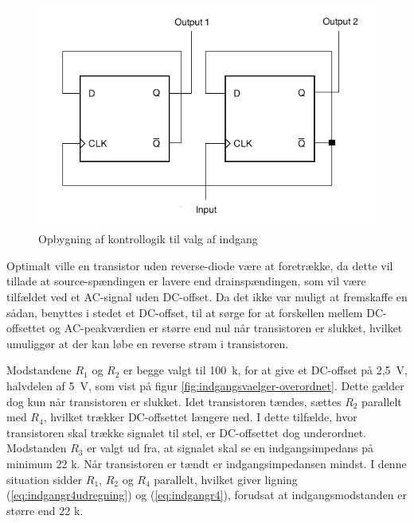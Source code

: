 \begin{figure}[h]
\centering
\includegraphics[scale=0.4]{teknisk/indgangsvaelger/flipflop.png}
\caption{Opbygning af kontrollogik til valg af indgang}
\label{fig:indgangsvaelger-flipflop}
\end{figure}

Optimalt ville en transistor uden reverse-diode være at foretrække, da dette vil tillade at source-spændingen er lavere end drainspændingen, som vil være tilfældet ved et AC-signal uden DC-offset. Da det ikke var muligt at fremskaffe en sådan, benyttes i stedet et DC-offset, til at sørge for at forskellen mellem DC-offsettet og AC-peakværdien er større end nul når transistoren er slukket, hvilket umuliggør at der kan løbe en reverse strøm i transistoren.

Modstandene $R_1$ og $R_2$ er begge valgt til 100~k\ohm, for at give et DC-offset på 2,5~V, halvdelen af 5~V, som vist på figur \ref{fig:indgangsvaelger-overordnet}. Dette gælder dog kun når transistoren er slukket. Idet transistoren tændes, sættes $R_2$ parallelt med $R_4$, hvilket trækker DC-offsettet længere ned.
I dette tilfælde, hvor transistoren skal trække signalet til stel, er DC-offsettet dog underordnet. 
Modstanden $R_3$ er valgt ud fra, at signalet skal se en indgangsimpedans på minimum 22 k\ohm. Når transistoren er tændt er indgangsimpedansen mindst. I denne situation sidder $R_1$, $R_2$ og $R_4$ parallelt, hvilket giver ligning (\ref{eq:indgangr4udregning}) og (\ref{eq:indgangr4}), forudsat at indgangsmodstanden er større end 22 k\ohm.

